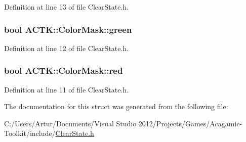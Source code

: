 Definition at line 13 of file Clear\-State.\-h.

\hypertarget{struct_a_c_t_k_1_1_color_mask_a268f8854b308c34c444234b77e2e14c5}{
\subsubsection[{green}]{\setlength{\rightskip}{0pt plus 5cm}bool A\-C\-T\-K\-::\-Color\-Mask\-::green}}\label{struct_a_c_t_k_1_1_color_mask_a268f8854b308c34c444234b77e2e14c5}


Definition at line 12 of file Clear\-State.\-h.

\hypertarget{struct_a_c_t_k_1_1_color_mask_a5bf146687b67213ef1c0c5f8a1b6c9d3}{
\subsubsection[{red}]{\setlength{\rightskip}{0pt plus 5cm}bool A\-C\-T\-K\-::\-Color\-Mask\-::red}}\label{struct_a_c_t_k_1_1_color_mask_a5bf146687b67213ef1c0c5f8a1b6c9d3}


Definition at line 11 of file Clear\-State.\-h.



The documentation for this struct was generated from the following file\-:\begin{DoxyCompactItemize}
\item 
C\-:/\-Users/\-Artur/\-Documents/\-Visual Studio 2012/\-Projects/\-Games/\-Acagamic-\/\-Toolkit/include/\hyperlink{_clear_state_8h}{Clear\-State.\-h}\end{DoxyCompactItemize}
